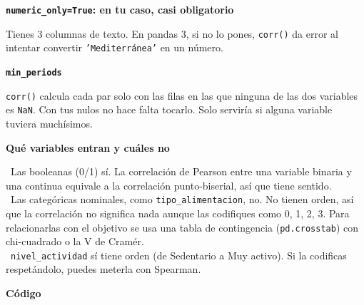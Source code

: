 \documentclass[11pt,a4paper]{article}
\begin{document}
{\textbf{\texttt{numeric\_\allowbreak{}only=True}: en tu caso, casi obligatorio}

Tienes 3 columnas de texto. En pandas 3, si no lo pones, \texttt{corr()} da error al intentar convertir \texttt{'Mediterránea'} en un número.

\textbf{\texttt{min\_\allowbreak{}periods}}

\texttt{corr()} calcula cada par solo con las filas en las que ninguna de las dos variables es \texttt{NaN}. Con tus nulos no hace falta tocarlo. Solo serviría si alguna variable tuviera muchísimos.

\textbf{Qué variables entran y cuáles no}

\hspace*{1.0em}\textbullet~Las booleanas (0/\allowbreak{}1) sí. La correlación de Pearson entre una variable binaria y una continua equivale a la correlación punto-biserial, así que tiene sentido. \\{}
\hspace*{1.0em}\textbullet~Las categóricas nominales, como \texttt{tipo\_\allowbreak{}alimentacion}, no. No tienen orden, así que la correlación no significa nada aunque las codifiques como 0, 1, 2, 3. Para relacionarlas con el objetivo se usa una tabla de contingencia (\texttt{pd.crosstab}) con chi-cuadrado o la V de Cramér. \\{}
\hspace*{1.0em}\textbullet~\texttt{nivel\_\allowbreak{}actividad} sí tiene orden (de Sedentario a Muy activo). Si la codificas respetándolo, puedes meterla con Spearman.

\textbf{Código}

}
\end{document}
